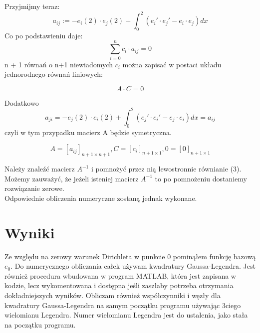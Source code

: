 \documentclass [dvipsnames] {article}
\begin{document}
	\begin {center}
		Przyjmijmy teraz:
	$$ a_{ij} := -e_i(2) \cdot e_j(2) + \int_{0}^{2} (e_i' \cdot e_j' - e_i \cdot e_j) dx $$
	Co po podstawieniu daje:
	$$ \sum_{i = 0}^{n} c_i \cdot a_{ij} = 0 $$
		n + 1 równań o n+1 niewiadomych $c_i$ można zapisać w postaci układu jednorodnego równań liniowych:
	\end {center}
	\begin {equation}	%
		A \cdot C = 0
	\end {equation}
	\begin {center}
			Dodatkowo
	$$ a_{ji}  = -e_j(2) \cdot e_i(2) + \int_{0}^{2} (e_j' \cdot e_i' - e_j \cdot e_i) dx = a_{ij} $$
	czyli w tym przypadku macierz A będzie symetryczna.
	\end {center}
	\begin {equation*}
		A = [a_{ij}]_{n+1 \times n+1}, C = [c_i]_{n+1 \times 1}, 0 = [0]_{n+1 \times 1}
	\end {equation*}
	\begin {center}
		Należy znaleźć macierz $A^{-1}$ i pomnożyć przez nią lewostronnie równianie (3). \\
		Możemy zauważyć, że jeżeli isteniej macierz $A^{-1}$ to po pomnożeniu dostaniemy rozwiązanie zerowe. \\
		Odpowiednie obliczenia numeryczne zostaną jednak wykonane.
	\end {center}
	
	\newpage
	\section {Wyniki}

	Ze względu na zerowy warunek Dirichleta w punkcie 0 pominąłem funkcję bazową $e_0$.
	Do numerycznego obliczania całek używam kwadratury Gaussa-Legendra. Jest również procedura wbudowana w program MATLAB,
	która jest zapisana w kodzie, lecz wykomentowana i dostępna jeśli zaszłaby potrzeba otrzymania dokładniejszych wyników.
	Obliczam również współczynniki i węzły dla kwadratury Gaussa-Legendra na samym początku programu używając 3ciego wielomianu Legendra.
	Numer wielomianu Legendra jest do ustalenia, jako stała na początku programu. \\ \\
\end{document}
